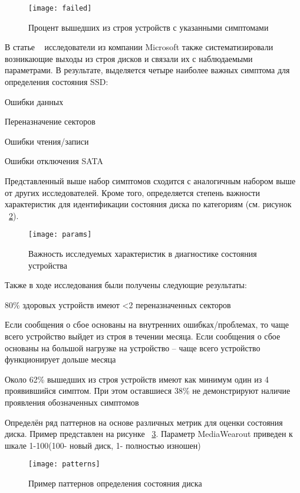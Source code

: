 \begin{figure}[h]
	\centering
	\texttt{[image: failed]}
	\caption{Процент вышедших из строя устройств 
с указанными симптомами}
	\label{fig:failed}
\end{figure}

В статье ~\cite{faildatacenter} исследователи из компании Microsoft также систематизировали возникающие выходы из строя дисков и связали их с наблюдаемыми параметрами. 
В результате, выделяется четыре наиболее важных симптома для определения состояния SSD:
\begin{itemize*}
	\item{Ошибки данных}
    \item{Переназначение секторов}
    \item{Ошибки чтения/записи}
    \item{Ошибки отключения SATA}
\end{itemize*}
Представленный выше набор симптомов сходится с аналогичным набором выше от других исследователей. 
Кроме того, определяется степень важности характеристик для идентификации состояния диска по категориям (см. рисунок ~\ref{fig:params}). 
\begin{figure}[!h]
	\centering
	\texttt{[image: params]}
	\caption{Важность исследуемых характеристик в 
		диагностике состояния устройства}
	\label{fig:params}
\end{figure}

Также в ходе исследования были получены следующие результаты:
\begin{itemize*}
	\item{80\% здоровых устройств имеют <2 переназначенных секторов}
    \item{Если сообщения о сбое основаны на внутренних ошибках/проблемах, то чаще всего устройство выйдет из строя в течении месяца. Если сообщения о сбое основаны на большой нагрузке на устройство – чаще всего устройство функционирует дольше месяца}
    \item{Около 62\% вышедших из строя устройств имеют как минимум один из 4 проявившийся симптом. При этом оставшиеся 38\% не демонстрируют наличие проявления обозначенных симптомов} 
    \item{Определён ряд паттернов на основе различных метрик для оценки состояния диска. Пример представлен на рисунке ~\ref{fig:patterns}. Параметр MediaWearout приведен к шкале 1-100(100- новый диск, 1- полностью изношен)}
\end{itemize*}

\begin{figure}[h]
	\centering
	\texttt{[image: patterns]}
	\caption{Пример паттернов определения состояния диска}
	\label{fig:patterns}
\end{figure}
 

